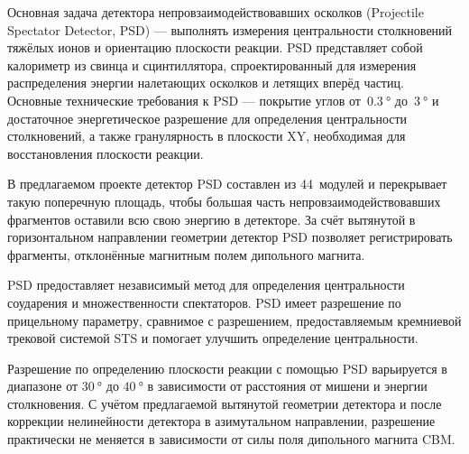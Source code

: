 \begin{minipage}[t]{0.495\textwidth}
Основная задача детектора непровзаимодействовавших осколков (Projectile Spectator Detector, PSD) --- выполнять измерения центральности столкновений тяжёлых ионов и ориентацию плоскости реакции. PSD представляет собой калориметр из свинца и сцинтиллятора, спроектированный для измерения распределения энергии налетающих осколков и летящих вперёд частиц. Основные технические требования к PSD --- покрытие углов от~$\SI{0.3}{\degree}$ до~$\SI{3}{\degree}$ и достаточное энергетическое разрешение для определения центральности столкновений, а также гранулярность в плоскости XY, необходимая для восстановления плоскости реакции. \\
\end{minipage}

В предлагаемом проекте детектор PSD составлен из 44~модулей и перекрывает такую поперечную площадь, чтобы большая часть непровзаимодействовавших фрагментов оставили всю свою энергию в детекторе. За счёт вытянутой в горизонтальном направлении геометрии детектор PSD позволяет регистрировать фрагменты, отклонённые магнитным полем дипольного магнита.

PSD предоставляет независимый метод для определения центральности соударения и множественности спектаторов.
PSD имеет разрешение по прицельному параметру, сравнимое с разрешением, предоставляемым кремниевой трековой системой STS и помогает улучшить определение центральности.

Разрешение по определению плоскости реакции с помощью PSD варьируется в диапазоне от $\SI{30}{\degree}$ до $\SI{40}{\degree}$ в зависимости от расстояния от мишени и энергии столкновения. С учётом предлагаемой вытянутой геометрии детектора и после коррекции нелинейности детектора в азимутальном направлении, разрешение практически не меняется в зависимости от силы поля дипольного магнита CBM.

